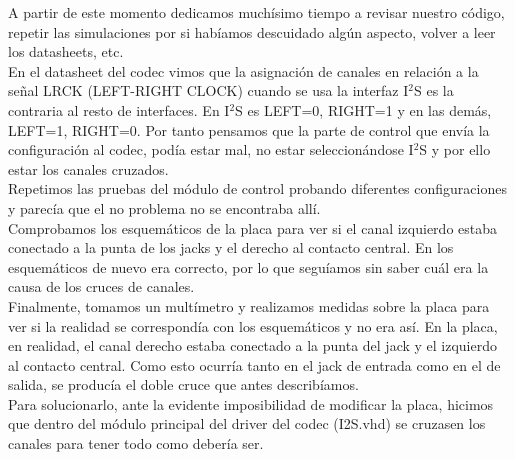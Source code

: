 A partir de este momento dedicamos muchísimo tiempo a revisar nuestro código, repetir las simulaciones por si habíamos descuidado algún aspecto, volver a leer los datasheets, etc.\\

En el datasheet del codec vimos que la asignación de canales en relación a la señal LRCK (LEFT-RIGHT CLOCK) cuando se usa la interfaz I$^2$S es la contraria al resto de interfaces. En I$^2$S es LEFT=0, RIGHT=1 y en las demás, LEFT=1, RIGHT=0. Por tanto pensamos que la parte de control que envía la configuración al codec, podía estar mal, no estar seleccionándose I$^2$S y por ello estar los canales cruzados.\\

Repetimos las pruebas del módulo de control probando diferentes configuraciones y parecía que el no problema no se encontraba allí.\\

Comprobamos los esquemáticos de la placa para ver si el canal izquierdo estaba conectado a la punta de los jacks y  el derecho al contacto central. En los esquemáticos de nuevo era correcto, por lo que seguíamos sin saber cuál era la causa de los cruces de canales.\\

Finalmente, tomamos un multímetro y realizamos medidas sobre la placa para ver si la realidad se correspondía con los esquemáticos y no era así. En la placa, en realidad, el canal derecho estaba conectado a la punta del jack y el izquierdo al contacto central. Como esto ocurría tanto en el jack de entrada como en el de salida, se producía el doble cruce que antes describíamos.\\

Para solucionarlo, ante la evidente imposibilidad de modificar la placa, hicimos que dentro del módulo principal del driver del codec (I2S.vhd) se cruzasen los canales para tener todo como debería ser.
		
	

	
